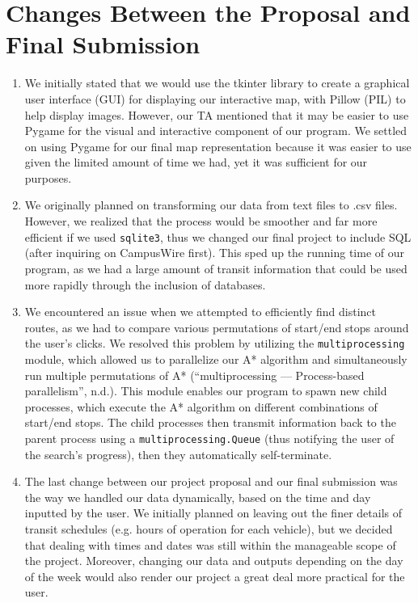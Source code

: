 \documentclass[fontsize=11pt]{article}
\begin{document}
    \section*{Changes Between the Proposal and Final Submission}

    \begin{enumerate}
        \item We initially stated that we would use the tkinter library to create a graphical user interface (GUI) for displaying our interactive map, with Pillow (PIL) to help display images. However, our TA mentioned that it may be easier to use Pygame for the visual and interactive component of our program. We settled on using Pygame for our final map representation because it was easier to use given the limited amount of time we had, yet it was sufficient for our purposes.
        \item We originally planned on transforming our data from text files to .csv files. However, we realized that the process would be smoother and far more efficient if we used \texttt{sqlite3}, thus we changed our final project to include SQL (after inquiring on CampusWire first). This sped up the running time of our program, as we had a large amount of transit information that could be used more rapidly through the inclusion of databases.
        \item We encountered an issue when we attempted to efficiently find distinct routes, as we had to compare various permutations of start/end stops around the user's clicks. We resolved this problem by utilizing the \texttt{multiprocessing} module, which allowed us to parallelize our A* algorithm and simultaneously run multiple permutations of A* (``multiprocessing — Process-based parallelism'', n.d.). This module enables our program to spawn new child processes, which execute the A* algorithm on different combinations of start/end stops. The child processes then transmit information back to the parent process using a \texttt{multiprocessing.Queue} (thus notifying the user of the search's progress), then they automatically self-terminate.
        \item The last change between our project proposal and our final submission was the way we handled our data dynamically, based on the time and day inputted by the user. We initially planned on leaving out the finer details of transit schedules (e.g. hours of operation for each vehicle), but we decided that dealing with times and dates was still within the manageable scope of the project. Moreover, changing our data and outputs depending on the day of the week would also render our project a great deal more practical for the user.
    \end{enumerate}
\end{document}
